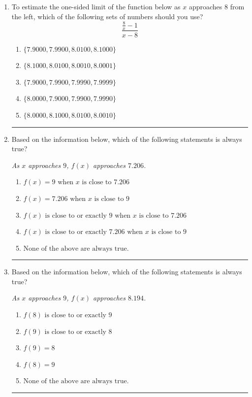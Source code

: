 \documentclass[14pt]{extbook}
\newcommand{\litem}[1]{\item#1\hspace*{-1cm}\rule{\textwidth}{0.4pt}}
\begin{document}
\begin{enumerate}
{\begin{enumerate}[label=\Alph*.]
\end{enumerate} }
\litem{
To estimate the one-sided limit of the function below as $x$ approaches 8 from the left, which of the following sets of numbers should you use?\[ \frac{\frac{8}{x} - 1}{x - 8} \]\begin{enumerate}[label=\Alph*.]
\item \( \{ 7.9000, 7.9900, 8.0100, 8.1000 \} \)
\item \( \{ 8.1000, 8.0100, 8.0010, 8.0001 \} \)
\item \( \{ 7.9000, 7.9900, 7.9990, 7.9999 \} \)
\item \( \{ 8.0000, 7.9000, 7.9900, 7.9990 \} \)
\item \( \{ 8.0000, 8.1000, 8.0100, 8.0010 \} \)

\end{enumerate} }
\litem{
Based on the information below, which of the following statements is always true?
\begin{center}
    \textit{ As $x$ approaches $9$, $f(x)$ approaches $7.206$. }
\end{center}
\begin{enumerate}[label=\Alph*.]
\item \( f(x) = 9 \text{ when } x \text{ is close to } 7.206 \)
\item \( f(x) = 7.206 \text{ when } x \text{ is close to } 9 \)
\item \( f(x) \text{ is close to or exactly } 9 \text{ when } x \text{ is close to } 7.206 \)
\item \( f(x) \text{ is close to or exactly } 7.206 \text{ when } x \text{ is close to } 9 \)
\item \( \text{None of the above are always true.} \)

\end{enumerate} }
\litem{
Based on the information below, which of the following statements is always true?
\begin{center}
    \textit{ As $x$ approaches $9$, $f(x)$ approaches $8.194$. }
\end{center}
\begin{enumerate}[label=\Alph*.]
\item \( f(8) \text{ is close to or exactly } 9 \)
\item \( f(9) \text{ is close to or exactly } 8 \)
\item \( f(9) = 8 \)
\item \( f(8) = 9 \)
\item \( \text{None of the above are always true.} \)


\end{enumerate}}
\end{enumerate}
\end{document}
